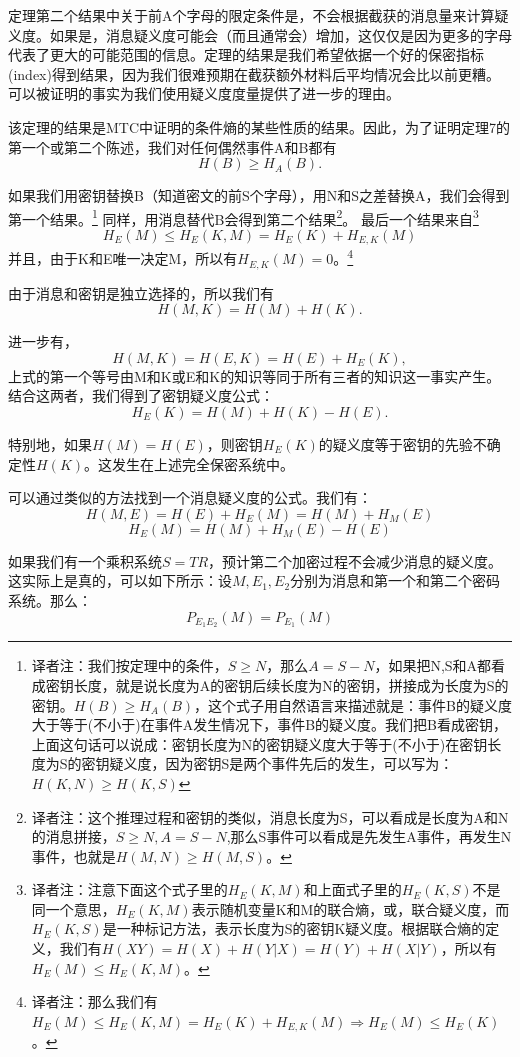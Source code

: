 \documentclass[]{article}
\begin{document}
定理第二个结果中关于前A个字母的限定条件是，不会根据截获的消息量来计算疑义度。如果是，消息疑义度可能会（而且通常会）增加，这仅仅是因为更多的字母代表了更大的可能范围的信息。定理的结果是我们希望依据一个好的保密指标(index)得到结果，因为我们很难预期在截获额外材料后平均情况会比以前更糟。可以被证明的事实为我们使用疑义度度量提供了进一步的理由。

该定理的结果是MTC中证明的条件熵的某些性质的结果。因此，为了证明定理7的第一个或第二个陈述，我们对任何偶然事件A和B都有
\[H(B)\geq H_A(B).\]

如果我们用密钥替换B（知道密文的前S个字母），用N和S之差替换A，我们会得到第一个结果。\footnote{译者注：我们按定理中的条件，$S\geq N$，那么$A=S-N$，如果把N,S和A都看成密钥长度，就是说长度为A的密钥后续长度为N的密钥，拼接成为长度为S的密钥。$H(B)\geq H_A(B)$，这个式子用自然语言来描述就是：事件B的疑义度大于等于(不小于)在事件A发生情况下，事件B的疑义度。我们把B看成密钥，上面这句话可以说成：密钥长度为N的密钥疑义度大于等于(不小于)在密钥长度为S的密钥疑义度，因为密钥S是两个事件先后的发生，可以写为：$H(K,N)\geq H(K,S)$}
同样，用消息替代B会得到第二个结果\footnote{译者注：这个推理过程和密钥的类似，消息长度为S，可以看成是长度为A和N的消息拼接，$S\geq N,A=S-N$,那么S事件可以看成是先发生A事件，再发生N事件，也就是$H(M,N)\geq H(M,S)$。}。
最后一个结果来自\footnote{译者注：注意下面这个式子里的$H_{E}(K,M)$和上面式子里的$H_{E}(K,S)$不是同一个意思，$H_{E}(K,M)$表示随机变量K和M的联合熵，或，联合疑义度，而$H_{E}(K,S)$是一种标记方法，表示长度为S的密钥K疑义度。根据联合熵的定义，我们有$H(XY)=H(X)+H(Y|X)=H(Y)+H(X|Y)$，所以有$H_E(M) \leq H_E(K,M) $。}
\[H_E(M) \leq H_E(K,M) = H_E(K) + H_{E,K}(M)\]
并且，由于K和E唯一决定M，所以有$H_{E,K}(M)=0$。\footnote{译者注：那么我们有$H_E(M) \leq H_E(K,M) = H_E(K) + H_{E,K}(M)\Rightarrow H_E(M) \leq H_E(K)$。}

由于消息和密钥是独立选择的，所以我们有
\[H(M,K)=H(M)+H(K).\]

进一步有，
\[H(M,K)=H(E,K)=H(E)+H_E(K),\]
上式的第一个等号由M和K或E和K的知识等同于所有三者的知识这一事实产生。结合这两者，我们得到了密钥疑义度公式：
\[H_E(K)=H(M)+H(K)-H(E).\]

特别地，如果$H(M)=H(E)$，则密钥$H_E(K)$的疑义度等于密钥的先验不确定性$H(K)$。这发生在上述完全保密系统中。

可以通过类似的方法找到一个消息疑义度的公式。我们有：
\[H(M,E)=H(E)+H_E(M)=H(M)+H_M(E)\]
\[H_E(M)=H(M)+H_M(E)-H(E)\]

如果我们有一个乘积系统$S=TR$，预计第二个加密过程不会减少消息的疑义度。这实际上是真的，可以如下所示：设$M,E_1,E_2$分别为消息和第一个和第二个密码系统。那么：
\[P_{E_1 E_2}(M)=P_{E_1}(M)\]
\end{document}
